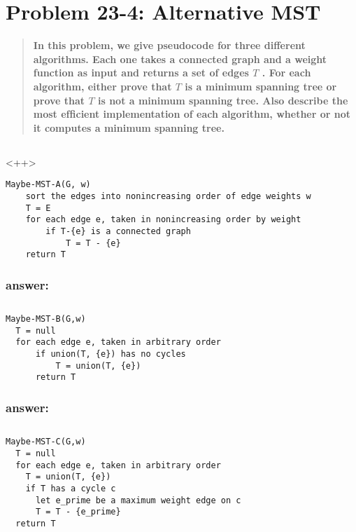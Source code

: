 \documentclass[titlepage]{article}\usepackage[]{graphicx}\usepackage[]{color}
\begin{document}
\section{Problem 23-4: Alternative MST}
\begin{quote}
  \textbf{ In this problem, we give pseudocode for three different algorithms.
	Each one takes a connected graph and a weight function as input and returns
	a set of edges $T$ .  For each algorithm, either prove that $T$ is a
	minimum spanning tree or prove that $T$ is not a minimum spanning tree.
	Also describe the most efﬁcient implementation of each algorithm, whether or
	not it computes a minimum spanning tree.  }
\end{quote}

\subsection{}<++>
\begin{lstlisting}
Maybe-MST-A(G, w)
	sort the edges into nonincreasing order of edge weights w
	T = E
	for each edge e, taken in nonincreasing order by weight
		if T-{e} is a connected graph
			T = T - {e}
	return T
\end{lstlisting}
\subsubsection{answer: }




\subsection{}
\begin{lstlisting}
Maybe-MST-B(G,w)
  T = null
  for each edge e, taken in arbitrary order
	  if union(T, {e}) has no cycles
		  T = union(T, {e})
	  return T
\end{lstlisting}
\subsubsection{answer: }



\subsection{}
\begin{lstlisting}
Maybe-MST-C(G,w)
  T = null
  for each edge e, taken in arbitrary order
	T = union(T, {e})
	if T has a cycle c
	  let e_prime be a maximum weight edge on c
	  T = T - {e_prime}
  return T
\end{lstlisting}
\end{document}
